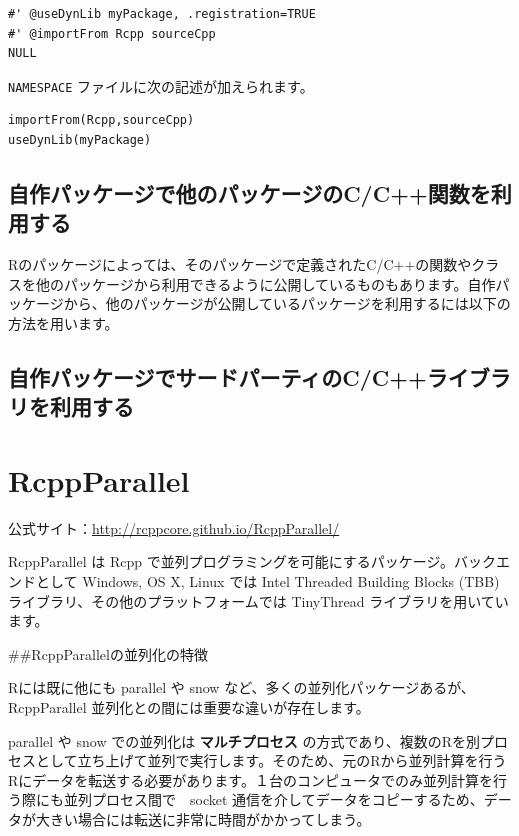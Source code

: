 \documentclass[]{book}
\begin{document}
\begin{verbatim}
#' @useDynLib myPackage, .registration=TRUE
#' @importFrom Rcpp sourceCpp
NULL
\end{verbatim}

\texttt{NAMESPACE} ファイルに次の記述が加えられます。

\begin{verbatim}
importFrom(Rcpp,sourceCpp)
useDynLib(myPackage)
\end{verbatim}

\hypertarget{cc}{%
\section{自作パッケージで他のパッケージのC/C++関数を利用する}\label{cc}}

Rのパッケージによっては、そのパッケージで定義されたC/C++の関数やクラスを他のパッケージから利用できるように公開しているものもあります。自作パッケージから、他のパッケージが公開しているパッケージを利用するには以下の方法を用います。

\hypertarget{cc}{%
\section{自作パッケージでサードパーティのC/C++ライブラリを利用する}\label{cc}}

\hypertarget{rcppparallel}{%
\chapter{RcppParallel}\label{rcppparallel}}

公式サイト：\url{http://rcppcore.github.io/RcppParallel/}

RcppParallel は Rcpp で並列プログラミングを可能にするパッケージ。バックエンドとして Windows, OS X, Linux では Intel Threaded Building Blocks (TBB) ライブラリ、その他のプラットフォームでは TinyThread ライブラリを用いています。

\#\#RcppParallelの並列化の特徴

Rには既に他にも parallel や snow など、多くの並列化パッケージあるが、RcppParallel 並列化との間には重要な違いが存在します。

parallel や snow での並列化は \textbf{マルチプロセス} の方式であり、複数のRを別プロセスとして立ち上げて並列で実行します。そのため、元のRから並列計算を行うRにデータを転送する必要があります。１台のコンピュータでのみ並列計算を行う際にも並列プロセス間で　socket 通信を介してデータをコピーするため、データが大きい場合には転送に非常に時間がかかってしまう。
\end{document}

